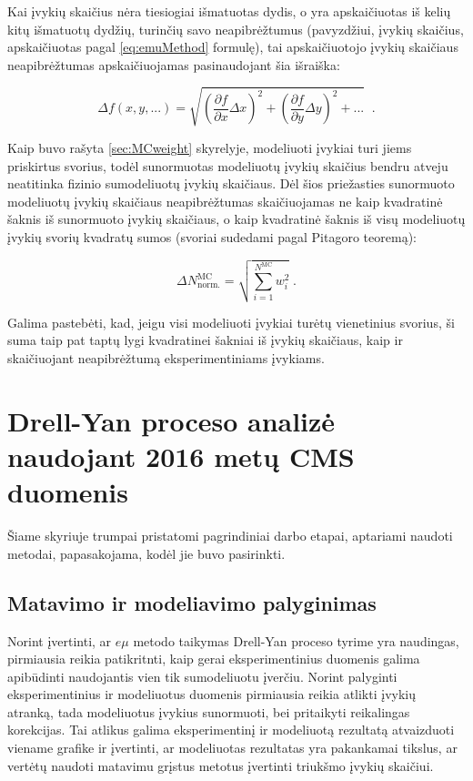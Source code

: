 \documentclass[a4paper, 12pt]{article}
\newcommand{\emu}{e\mu}
\newlength\q
\begin{document}
Kai įvykių skaičius nėra tiesiogiai išmatuotas dydis, o yra apskaičiuotas iš kelių kitų išmatuotų dydžių, turinčių savo
neapibrėžtumus (pavyzdžiui, įvykių skaičius, apskaičiuotas pagal \eqref{eq:emuMethod} formulę), tai apskaičiuotojo įvykių
skaičiaus neapibrėžtumas apskaičiuojamas pasinaudojant šia išraiška:

\begin{equation}
	\Delta f(x, y, ...) =
	\sqrt{ \left( \frac{\partial f}{\partial x} \Delta x \right)^{2} +
	\left( \frac{\partial f}{\partial y} \Delta y \right)^{2} + ... } \;\; \mathrm{.}
	\label{eq:DerUnc}
\end{equation}

Kaip buvo rašyta \ref{sec:MCweight} skyrelyje, modeliuoti įvykiai turi jiems priskirtus svorius, todėl sunormuotas modeliuotų įvykių
skaičius bendru atveju neatitinka fizinio sumodeliuotų įvykių skaičiaus.
Dėl šios priežasties sunormuoto modeliuotų įvykių skaičiaus neapibrėžtumas skaičiuojamas ne kaip kvadratinė šaknis iš
sunormuoto įvykių skaičiaus, o kaip kvadratinė šaknis iš visų modeliuotų įvykių svorių kvadratų sumos (svoriai sudedami
pagal Pitagoro teoremą):

\begin{equation}
	\Delta N^{\mathrm{MC}}_{\mathrm{norm.}} = \sqrt{\sum_{i=1}^{N^{\mathrm{MC}}}w_{i}^{2}} \; .
	\label{eq:Sumw2Unc}
\end{equation}

Galima pastebėti, kad, jeigu visi modeliuoti įvykiai turėtų vienetinius svorius, ši suma taip pat taptų lygi kvadratinei
šakniai iš įvykių skaičiaus, kaip ir skaičiuojant neapibrėžtumą eksperimentiniams įvykiams.

\clearpage
\section{Drell-Yan proceso analizė naudojant 2016 metų CMS duomenis}

Šiame skyriuje trumpai pristatomi pagrindiniai darbo etapai, aptariami naudoti metodai, papasakojama, kodėl jie buvo pasirinkti.

\subsection{Matavimo ir modeliavimo palyginimas}

Norint įvertinti, ar $\emu$ metodo taikymas Drell-Yan proceso tyrime yra naudingas, pirmiausia reikia patikritnti, kaip
gerai eksperimentinius duomenis galima apibūdinti naudojantis vien tik sumodeliuotu įverčiu.
Norint palyginti eksperimentinius ir modeliuotus duomenis pirmiausia reikia atlikti įvykių atranką, tada modeliuotus
įvykius sunormuoti, bei pritaikyti reikalingas korekcijas.
Tai atlikus galima eksperimentinį ir modeliuotą rezultatą atvaizduoti viename grafike ir įvertinti, ar modeliuotas
rezultatas yra pakankamai tikslus, ar vertėtų naudoti matavimu grįstus metotus įvertinti triukšmo įvykių skaičiui.
\end{document}

